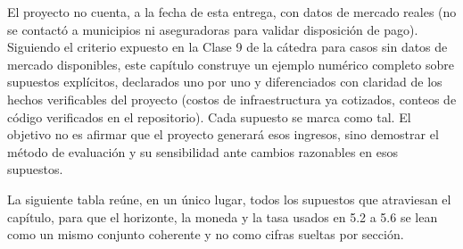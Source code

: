 El proyecto no cuenta, a la fecha de esta entrega, con datos de mercado
reales (no se contactó a municipios ni aseguradoras para validar
disposición de pago). Siguiendo el criterio expuesto en la Clase 9 de la
cátedra para casos sin datos de mercado disponibles, este capítulo
construye un ejemplo numérico completo sobre supuestos explícitos,
declarados uno por uno y diferenciados con claridad de los hechos
verificables del proyecto (costos de infraestructura ya cotizados,
conteos de código verificados en el repositorio). Cada supuesto se marca
como tal. El objetivo no es afirmar que el proyecto generará esos
ingresos, sino demostrar el método de evaluación y su sensibilidad ante
cambios razonables en esos supuestos.

La siguiente tabla reúne, en un único lugar, todos los supuestos que
atraviesan el capítulo, para que el horizonte, la moneda y la tasa
usados en 5.2 a 5.6 se lean como un mismo conjunto coherente y no como
cifras sueltas por sección.

